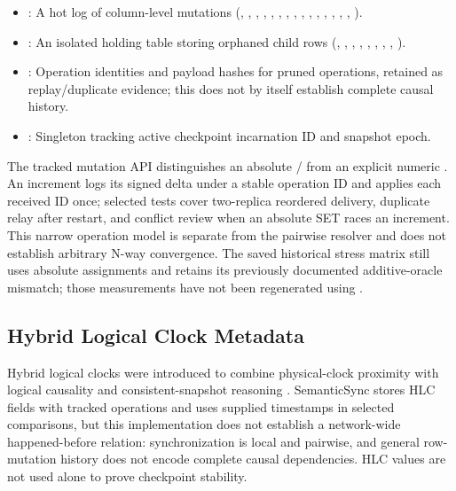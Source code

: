 \documentclass[runningheads]{llncs}
\begin{document}
\begin{itemize}
\item \texttt{}: A hot log of column-level mutations (\texttt{}, \texttt{}, \texttt{}, \texttt{}, \texttt{}, \texttt{}, \texttt{}, \texttt{}, \texttt{}, \texttt{}, \texttt{}, \texttt{}, \texttt{}, \texttt{}, \texttt{}, \texttt{}).
\item \texttt{}: An isolated holding table storing orphaned child rows (\texttt{}, \texttt{}, \texttt{}, \texttt{}, \texttt{}, \texttt{}, \texttt{}, \texttt{}, \texttt{}).
\item \texttt{}: Operation identities and payload hashes for pruned operations, retained as replay/duplicate evidence; this does not by itself establish complete causal history.
\item \texttt{}: Singleton tracking active checkpoint incarnation ID and snapshot epoch.
\end{itemize}
The tracked mutation API distinguishes an absolute \texttt{}/\texttt{} from an explicit numeric \texttt{}. An increment logs its signed delta under a stable operation ID and applies each received ID once; selected tests cover two-replica reordered delivery, duplicate relay after restart, and conflict review when an absolute SET races an increment. This narrow operation model is separate from the pairwise \texttt{} resolver and does not establish arbitrary N-way convergence. The saved historical stress matrix still uses absolute assignments and retains its previously documented additive-oracle mismatch; those measurements have not been regenerated using \texttt{}.

\subsection{Hybrid Logical Clock Metadata}
Hybrid logical clocks were introduced to combine physical-clock proximity with logical causality and consistent-snapshot reasoning \cite{kulkarni2014hlc}. SemanticSync stores HLC fields with tracked operations and uses supplied timestamps in selected comparisons, but this implementation does not establish a network-wide happened-before relation: synchronization is local and pairwise, and general row-mutation history does not encode complete causal dependencies. HLC values are not used alone to prove checkpoint stability.
\end{document}
